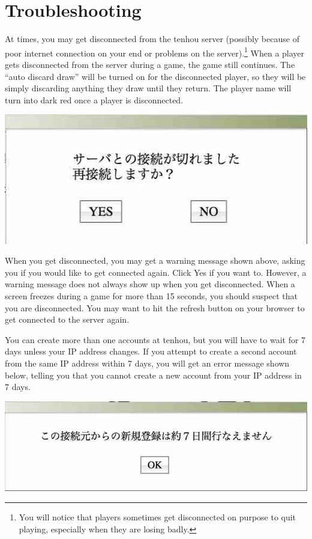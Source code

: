 \section{Troubleshooting}

At times, you may get disconnected from the {\jap tenhou} server (possibly because of poor internet connection on your end or problems on the server).\footnote{You will notice that players sometimes get disconnected on purpose to quit playing, especially when they are losing badly.}
When a player gets disconnected from the server during a game, the game still continues. The ``auto discard draw'' will be turned on for the disconnected player, so they will be simply discarding anything they draw until they return. The player name will turn into dark red once a player is disconnected. 

\begin{center}
\includegraphics[width=.5\textwidth,clip]{figs/warning2.jpg}
\end{center}

When you get disconnected, you may get a warning message shown above, asking you if you would like to get connected again. Click Yes if you want to. However, a warning message does not always show up when you get disconnected. When a screen freezes during a game for more than 15 seconds, you should suspect that you are disconnected. You may want to hit the refresh button on your browser to get connected to the server again. 

\bigskip
You can create more than one accounts at {\jap tenhou}, but you will have to wait for 7 days unless your IP address changes. If you attempt to create a second account from the same IP address within 7 days, you will get an error message shown below, telling you that you cannot create a new account from your IP address in 7 days. 

\begin{center}
\includegraphics[width=.5\textwidth,clip]{figs/warning1.jpg}
\end{center}

